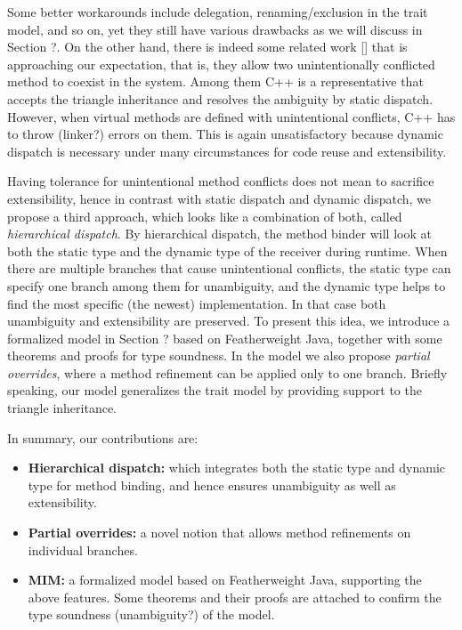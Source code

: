 Some better workarounds include delegation, renaming/exclusion in the trait model, and so on, yet they still have various drawbacks as we will discuss in Section ?. On the other hand, there is indeed some related work [] that is approaching our expectation, that is, they allow two unintentionally conflicted method to coexist in the system. Among them C++ is a representative that accepts the triangle inheritance and resolves the ambiguity by static dispatch. However, when virtual methods are defined with unintentional conflicts, C++ has to throw (linker?) errors on them.
This is again unsatisfactory because dynamic dispatch is necessary under many circumstances for code reuse and extensibility.

Having tolerance for unintentional method conflicts does not mean to sacrifice extensibility, hence in contrast with static dispatch and dynamic dispatch, we propose a third approach, which looks like a combination of both, called \textit{hierarchical dispatch}. By hierarchical dispatch, the method binder will look at both the static type and the dynamic type of the receiver during runtime. When there are multiple branches that cause unintentional conflicts, the static type can specify one branch among them for unambiguity, and the dynamic type helps to find the most specific (the newest) implementation. In that case both unambiguity and extensibility are preserved. To present this idea, we introduce a formalized model in Section ? based on Featherweight Java, together with some theorems and proofs for type soundness. In the model we also propose \textit{partial overrides}, where a method refinement can be applied only to one branch. Briefly speaking, our model generalizes the trait model by providing support to the triangle inheritance.

In summary, our contributions are: 
\begin{itemize}
	\item \textbf{Hierarchical dispatch:} which integrates both the static type and dynamic type for method binding, and hence
	ensures unambiguity as well as extensibility.
	\item \textbf{Partial overrides:} a novel notion that allows method refinements on individual branches.
	\item \textbf{MIM:} a formalized model based on Featherweight Java, supporting the above features. Some theorems and their proofs
	are attached to confirm the type soundness (unambiguity?) of the model.
\end{itemize}

 